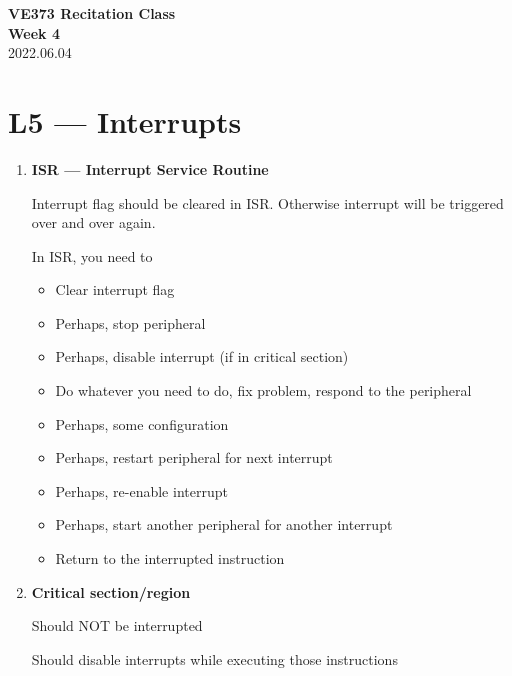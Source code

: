 \documentclass[a4paper]{article}
\begin{document}
\renewcommand{\thesection}{\Roman{section}}
\renewcommand{\thesubsection}{\Alph{subsection}}
\renewcommand{\thesubsubsection}{\thesubsection.\arabic{subsubsection}}
\renewcommand{\d}{\: \mathrm{d}}
\newcommand{\e}{\mathrm{e}}

\begin{center}
  \textbf{\Large VE373 Recitation Class}\\[1em]
  \textbf{\large Week 4} \\[1em]
  2022.06.04 \\[1em]
\end{center}

\section*{L5 --- Interrupts}
  \begin{enumerate}[label = \arabic*.]
    \item \textbf{ISR --- Interrupt Service Routine}
      \par Interrupt flag should be cleared in ISR\@. Otherwise interrupt will be triggered over and over again.

      \par In ISR, you need to
      \begin{itemize}[leftmargin = 1cm]
        \item Clear interrupt flag
        \item Perhaps, stop peripheral
        \item Perhaps, disable interrupt (if in critical section)
        \item Do whatever you need to do, fix problem, respond to the peripheral
        \item Perhaps, some configuration
        \item Perhaps, restart peripheral for next interrupt
        \item Perhaps, re-enable interrupt
        \item Perhaps, start another peripheral for another interrupt
        \item Return to the interrupted instruction
      \end{itemize}

    \item \textbf{Critical section/region}
      \par Should NOT be interrupted
      \par Should disable interrupts while executing those instructions


\end{enumerate}
\end{document}
